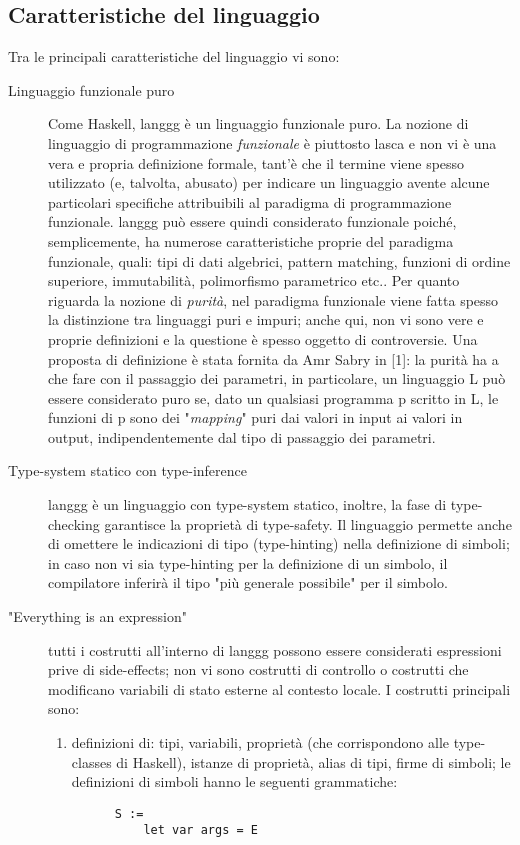 \documentclass[10pt,a4paper]{article}
\begin{document}
\subsection{Caratteristiche del linguaggio}
Tra le principali caratteristiche del linguaggio vi sono:
\begin{description}
\item[Linguaggio funzionale puro] Come Haskell, langgg è un linguaggio funzionale puro. La nozione di linguaggio
di programmazione \textit{funzionale} è piuttosto lasca e non vi è una vera e propria definizione formale,
tant'è che il termine viene spesso utilizzato (e, talvolta, abusato) per indicare un linguaggio avente alcune
particolari specifiche attribuibili al paradigma di programmazione funzionale. langgg può essere quindi considerato
funzionale poiché, semplicemente, ha numerose caratteristiche proprie del paradigma funzionale, quali: tipi di dati
algebrici, pattern matching, funzioni di ordine superiore, immutabilità, polimorfismo parametrico etc.. Per quanto
riguarda la nozione di \textit{purità}, nel paradigma funzionale viene fatta spesso la distinzione
tra linguaggi puri e impuri; anche qui, non vi sono vere e proprie definizioni e la questione è spesso oggetto di
controversie. Una proposta di definizione è stata fornita da Amr Sabry in [1]: la purità ha a che fare con il passaggio
dei parametri, in particolare, un linguaggio L può essere
considerato puro se, dato un qualsiasi programma p scritto in L, le funzioni di p sono dei "\textit{mapping}" puri
dai valori in input ai valori in output, indipendentemente dal tipo di passaggio dei parametri.
\item[Type-system statico con type-inference] langgg è un linguaggio con type-system statico, inoltre, la fase di
type-checking garantisce la proprietà di type-safety. Il linguaggio permette anche di omettere le indicazioni di
tipo (type-hinting) nella definizione di simboli; in caso non vi sia type-hinting per la definizione di un simbolo,
il compilatore inferirà il tipo "più generale possibile" per il simbolo.
\item["Everything is an expression"] tutti i costrutti all'interno di langgg possono essere considerati espressioni
prive di side-effects; non vi sono costrutti di controllo o costrutti che modificano variabili di stato esterne
al contesto locale. I costrutti principali sono:
    \begin{enumerate}
    \item definizioni di: tipi, variabili, proprietà (che corrispondono alle type-classes di Haskell), istanze di
    proprietà, alias di tipi, firme di simboli; le definizioni di simboli hanno le seguenti grammatiche:
    \begin{lstlisting}
      S :=
          let var args = E


\end{lstlisting}
\end{enumerate}
\end{description}
\end{document}
